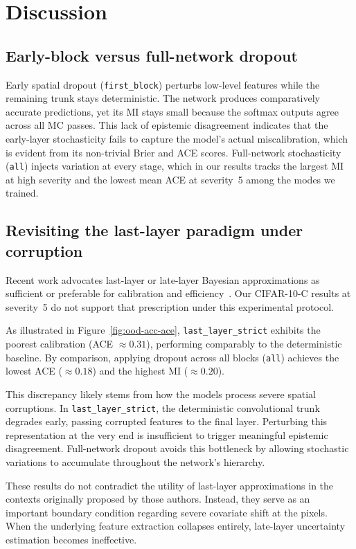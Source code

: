 \documentclass[10pt,twocolumn,letterpaper]{article}
\begin{document}
\section{Discussion}
\label{sec:disc}

\subsection{Early-block versus full-network dropout}
Early spatial dropout (\texttt{first\_block}) perturbs low-level features while the remaining trunk stays deterministic. The network produces comparatively accurate predictions, yet its MI stays small because the softmax outputs agree across all MC passes. This lack of epistemic disagreement indicates that the early-layer stochasticity fails to capture the model's actual miscalibration, which is evident from its non-trivial Brier and ACE scores. Full-network stochasticity (\texttt{all}) injects variation at every stage, which in our results tracks the largest MI at high severity and the lowest mean ACE at severity~5 among the modes we trained.

\subsection{Revisiting the last-layer paradigm under corruption}
Recent work advocates last-layer or late-layer Bayesian approximations as sufficient or preferable for calibration and efficiency~\cite{kristiadi2020being,daxberger2021laplace}. Our CIFAR-10-C results at severity~5 do not support that prescription under this experimental protocol.

As illustrated in Figure~\ref{fig:ood-acc-ace}, \texttt{last\_layer\_strict} exhibits the poorest calibration (ACE $\approx 0.31$), performing comparably to the deterministic baseline. By comparison, applying dropout across all blocks (\texttt{all}) achieves the lowest ACE ($\approx 0.18$) and the highest MI ($\approx 0.20$).

This discrepancy likely stems from how the models process severe spatial corruptions. In \texttt{last\_layer\_strict}, the deterministic convolutional trunk degrades early, passing corrupted features to the final layer. Perturbing this representation at the very end is insufficient to trigger meaningful epistemic disagreement. Full-network dropout avoids this bottleneck by allowing stochastic variations to accumulate throughout the network's hierarchy.

These results do not contradict the utility of last-layer approximations in the contexts originally proposed by those authors. Instead, they serve as an important boundary condition regarding severe covariate shift at the pixels. When the underlying feature extraction collapses entirely, late-layer uncertainty estimation becomes ineffective.
\end{document}
